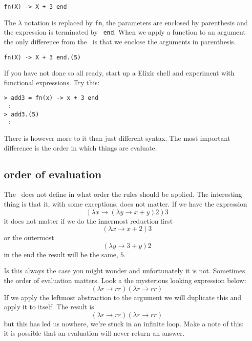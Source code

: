 \documentclass[a4paper,11pt]{article}
\begin{document}
\vspace{10pt}
\begin{center}{\tt fn(X) ->  X  + 3 end}
\end{center}
\vspace{10pt}

The $\lambda$ notation is replaced by {\tt fn}, the parameters are
enclosed by parenthesis and the expression is terminated by {\tt
  end}. When we apply a function to an argument the only difference
from the \lamc\ is that we enclose the arguments in parenthesis.

\vspace{10pt}
\begin{center}{\tt fn(X) ->  X  + 3 end.(5)}
\end{center}
\vspace{10pt}

If you have not done so all ready, start up a Elixir shell and
experiment with functional expressions. Try this:

\begin{verbatim}
> add3 = fn(x) -> x + 3 end
 :
> add3.(5)
 :
\end{verbatim}

There is however more to it than just different syntax. The most
important difference is the order in which things are evaluate.


\subsection{order of evaluation}

The \lamc\ does not define in what order the rules should be applied. The
interesting thing is that it, with some exceptions, does not matter. If we
have the expression
$$(\lambda x \rightarrow (\lambda y \rightarrow x + y) 2) 3$$ 
it does not matter if we do the innermost reduction first
$$(\lambda x \rightarrow x + 2) 3$$ 
or the outermost 
$$ (\lambda y \rightarrow 3 + y) 2$$ 
in the end the result will be the same, $5$.

Is this always the case you might wonder and unfortunately it is not.
Sometimes the order of evaluation matters. Look a the mysterious
looking expression below:
$$(\lambda r \rightarrow r r)(\lambda r \rightarrow r r)$$ 
If we apply the leftmost abstraction to the argument we will duplicate
this and apply it to itself. The result is
$$(\lambda r \rightarrow r r)(\lambda r \rightarrow r r)$$ 
but this has led us nowhere, we're stuck in an infinite loop. Make a
note of this: it is possible that an evaluation will never return an answer.
\end{document}
